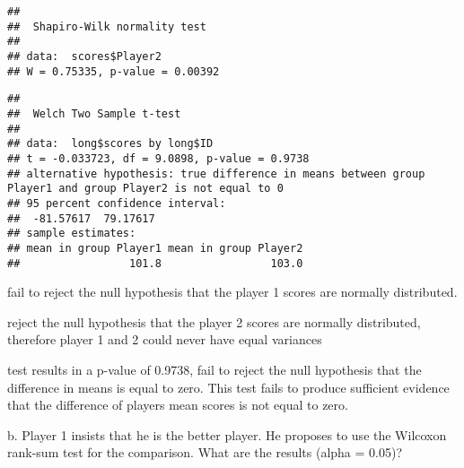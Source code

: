 \documentclass[
]{article}
\newenvironment{Shaded}{\begin{snugshade}}{\end{snugshade}}
\newcommand{\AttributeTok}[1]{\textcolor[rgb]{0.13,0.29,0.53}{#1}}
\newcommand{\ConstantTok}[1]{\textcolor[rgb]{0.56,0.35,0.01}{#1}}
\newcommand{\FunctionTok}[1]{\textcolor[rgb]{0.13,0.29,0.53}{\textbf{#1}}}
\newcommand{\NormalTok}[1]{#1}
\newcommand{\SpecialCharTok}[1]{\textcolor[rgb]{0.81,0.36,0.00}{\textbf{#1}}}
\newcommand{\StringTok}[1]{\textcolor[rgb]{0.31,0.60,0.02}{#1}}
\begin{document}
\begin{Shaded}
\end{Shaded}

\begin{verbatim}
## 
##  Shapiro-Wilk normality test
## 
## data:  scores$Player2
## W = 0.75335, p-value = 0.00392
\end{verbatim}

\begin{Shaded}
\end{Shaded}

\begin{verbatim}
## 
##  Welch Two Sample t-test
## 
## data:  long$scores by long$ID
## t = -0.033723, df = 9.0898, p-value = 0.9738
## alternative hypothesis: true difference in means between group Player1 and group Player2 is not equal to 0
## 95 percent confidence interval:
##  -81.57617  79.17617
## sample estimates:
## mean in group Player1 mean in group Player2 
##                 101.8                 103.0
\end{verbatim}

fail to reject the null hypothesis that the player 1 scores are normally
distributed.

reject the null hypothesis that the player 2 scores are normally
distributed, therefore player 1 and 2 could never have equal variances

test results in a p-value of 0.9738, fail to reject the null hypothesis
that the difference in means is equal to zero. This test fails to
produce sufficient evidence that the difference of players mean scores
is not equal to zero.

b. Player 1 insists that he is the better player. He proposes to use the
Wilcoxon rank-sum test for the comparison. What are the results (alpha =
0.05)?

\begin{Shaded}
\end{Shaded}
\end{document}
